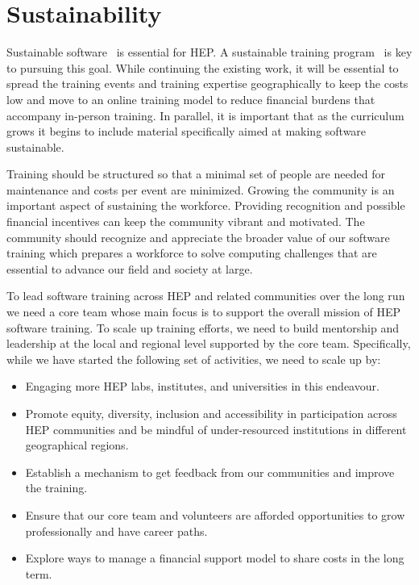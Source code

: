 \documentclass[twocolumn]{svjour3}          %
\begin{document}
\section{Sustainability}\label{sec:Sustainability}

Sustainable software~\cite{dan_katz} is essential for HEP.
A sustainable training program~\cite{sustainability_flashtalk} is key to pursuing this goal.
While continuing the existing work, it will be essential to  spread the training events and training expertise geographically to keep the costs low and move to an online training model to reduce financial burdens that accompany in-person training. In parallel, it is important that as the curriculum grows it begins to include material specifically aimed at making software sustainable.

Training should be structured so that a minimal set of people are needed for maintenance and costs per event are minimized.
Growing the community is an important aspect of sustaining the workforce. Providing recognition and possible financial incentives can keep the community vibrant and motivated.
The community should recognize and appreciate the broader value of our software training which prepares a workforce to solve computing challenges that are essential to advance our field and society at large.

To lead software training across HEP and related communities over the long run we need a core team whose main focus is to support the overall mission of HEP software training. To scale up training efforts, we need to build mentorship and leadership at the local and regional level supported by the core team. Specifically, while we have started the following set of activities, we need to scale up by:
%
\begin{itemize}
\item Engaging more HEP labs, institutes, and universities in this endeavour.
\item Promote equity, diversity, inclusion and accessibility in participation across HEP communities and  be mindful of under-resourced institutions in different geographical regions.
\item Establish a mechanism to get feedback from our communities and improve the training.
\item Ensure that our core team and volunteers are afforded opportunities to grow professionally and have career paths.
\item Explore ways to manage a financial support model to share costs in the long term.
%
\end{itemize}
\end{document}
